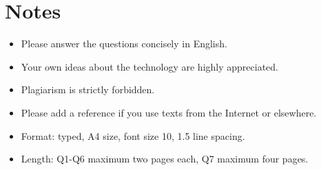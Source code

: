 \documentclass{article}
\begin{document}
\section*{Notes}

\begin{itemize}
\item Please answer the questions concisely in English.
\item Your own ideas about the technology are highly appreciated.
\item Plagiarism is strictly forbidden.
\item Please add a reference if you use texts from the Internet or elsewhere.
\item Format: typed, A4 size, font size 10, 1.5 line spacing.
\item Length: Q1-Q6 maximum two pages each, Q7 maximum four pages.
\end{itemize}
\end{document}
